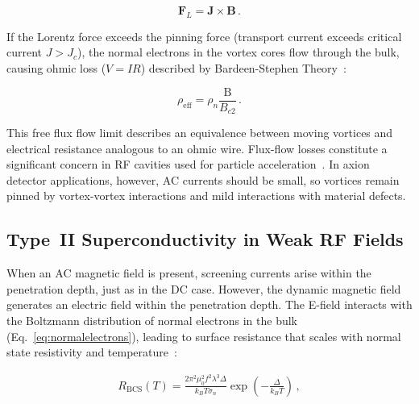     \begin{equation}
        \mathbf{F}_L = \mathbf{J} \times \mathbf{B}\,.
        \label{eq:lorentzforce}
    \end{equation}
    
    \noindent If the Lorentz force exceeds the pinning force (transport current exceeds critical current $J>J_c$), the normal electrons in the vortex cores flow through the bulk, causing ohmic loss ($V=IR$) described by Bardeen-Stephen Theory~\cite{Bardeen:1965zz}:

    \begin{equation}
        \rho_{\text{eff}} = \rho_n \frac{\text{B}}{B_{c2}}\,.
        \label{eq:rhoeffective}
    \end{equation}

     \noindent This free flux flow limit describes an equivalence between moving vortices and electrical resistance analogous to an ohmic wire. Flux-flow losses constitute a significant concern in RF cavities used for particle acceleration~\cite{padamseeRFSuperconductivity2009}. In axion detector applications, however, AC currents should be small, so vortices remain pinned by vortex-vortex interactions and mild interactions with material defects.

    \subsection{Type~II Superconductivity in Weak RF Fields}
    
    
    
    When an AC magnetic field is present, screening currents arise within the penetration depth, just as in the DC case. However, the dynamic magnetic field generates an electric field within the penetration depth. The E-field interacts with the Boltzmann distribution of normal electrons in the bulk (Eq.~\ref{eq:normalelectrons}), leading to surface resistance that scales with normal state resistivity and temperature~\cite{padamseeRFSuperconductivity2009}: 

    \begin{align}
        R_{\text{BCS}}(T) = \frac{2 \pi^2 \mu_0^2 f^2 \lambda^3 \Delta}{ k_B T \sigma_n} \exp\left(-\frac{\Delta}{k_B T}\right)\,,
        \label{eq:RBCS}
    \end{align}  

